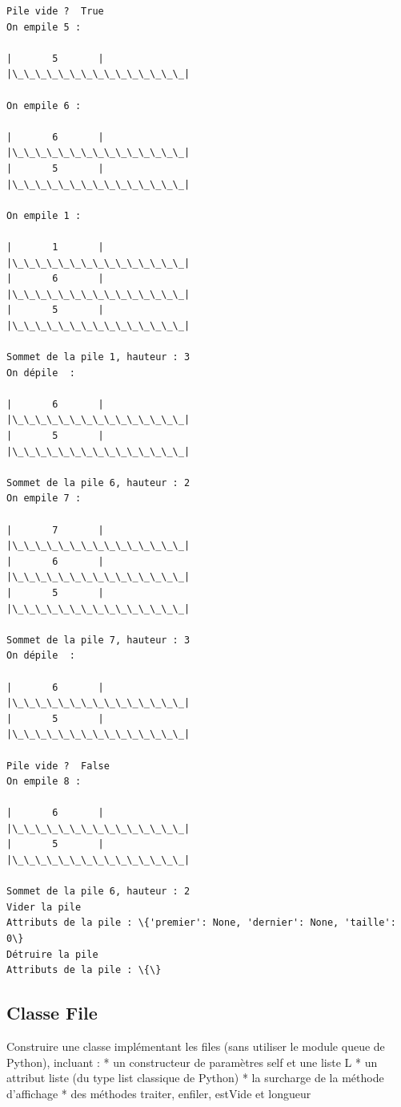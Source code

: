 \documentclass[11pt]{article}
\begin{document}
    \begin{Verbatim}[commandchars=\\\{\}]
Pile vide ?  True
On empile 5 : 

|       5       |
|\_\_\_\_\_\_\_\_\_\_\_\_\_\_\_|

On empile 6 : 

|       6       |
|\_\_\_\_\_\_\_\_\_\_\_\_\_\_\_|
|       5       |
|\_\_\_\_\_\_\_\_\_\_\_\_\_\_\_|

On empile 1 : 

|       1       |
|\_\_\_\_\_\_\_\_\_\_\_\_\_\_\_|
|       6       |
|\_\_\_\_\_\_\_\_\_\_\_\_\_\_\_|
|       5       |
|\_\_\_\_\_\_\_\_\_\_\_\_\_\_\_|

Sommet de la pile 1, hauteur : 3
On dépile  : 

|       6       |
|\_\_\_\_\_\_\_\_\_\_\_\_\_\_\_|
|       5       |
|\_\_\_\_\_\_\_\_\_\_\_\_\_\_\_|

Sommet de la pile 6, hauteur : 2
On empile 7 : 

|       7       |
|\_\_\_\_\_\_\_\_\_\_\_\_\_\_\_|
|       6       |
|\_\_\_\_\_\_\_\_\_\_\_\_\_\_\_|
|       5       |
|\_\_\_\_\_\_\_\_\_\_\_\_\_\_\_|

Sommet de la pile 7, hauteur : 3
On dépile  : 

|       6       |
|\_\_\_\_\_\_\_\_\_\_\_\_\_\_\_|
|       5       |
|\_\_\_\_\_\_\_\_\_\_\_\_\_\_\_|

Pile vide ?  False
On empile 8 : 

|       6       |
|\_\_\_\_\_\_\_\_\_\_\_\_\_\_\_|
|       5       |
|\_\_\_\_\_\_\_\_\_\_\_\_\_\_\_|

Sommet de la pile 6, hauteur : 2
Vider la pile
Attributs de la pile : \{'premier': None, 'dernier': None, 'taille': 0\}
Détruire la pile
Attributs de la pile : \{\}

    \end{Verbatim}

    \hypertarget{classe-file}{%
\subsection{Classe File}\label{classe-file}}

Construire une classe implémentant les files (sans utiliser le module
queue de Python), incluant : * un constructeur de paramètres self et une
liste L * un attribut liste (du type list classique de Python) * la
surcharge de la méthode d'affichage * des méthodes traiter, enfiler,
estVide et longueur
\end{document}
